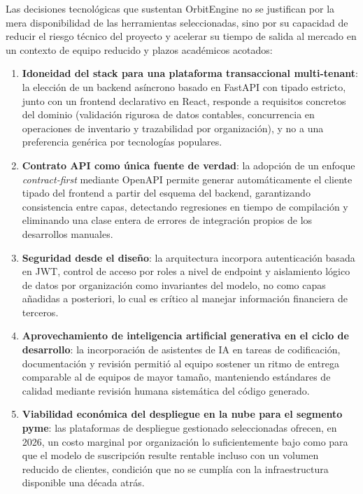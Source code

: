 Las decisiones tecnológicas que sustentan OrbitEngine no se justifican por la mera disponibilidad de las herramientas seleccionadas, sino por su capacidad de reducir el riesgo técnico del proyecto y acelerar su tiempo de salida al mercado en un contexto de equipo reducido y plazos académicos acotados:

\begin{enumerate}
\def\labelenumi{\arabic{enumi}.}
\tightlist
\item
  \textbf{Idoneidad del stack para una plataforma transaccional multi-tenant}: la elección de un backend asíncrono basado en FastAPI con tipado estricto, junto con un frontend declarativo en React, responde a requisitos concretos del dominio (validación rigurosa de datos contables, concurrencia en operaciones de inventario y trazabilidad por organización), y no a una preferencia genérica por tecnologías populares.
\item
  \textbf{Contrato API como única fuente de verdad}: la adopción de un enfoque \emph{contract-first} mediante OpenAPI permite generar automáticamente el cliente tipado del frontend a partir del esquema del backend, garantizando consistencia entre capas, detectando regresiones en tiempo de compilación y eliminando una clase entera de errores de integración propios de los desarrollos manuales.
\item
  \textbf{Seguridad desde el diseño}: la arquitectura incorpora autenticación basada en JWT, control de acceso por roles a nivel de endpoint y aislamiento lógico de datos por organización como invariantes del modelo, no como capas añadidas a posteriori, lo cual es crítico al manejar información financiera de terceros.
\item
  \textbf{Aprovechamiento de inteligencia artificial generativa en el ciclo de desarrollo}: la incorporación de asistentes de IA en tareas de codificación, documentación y revisión permitió al equipo sostener un ritmo de entrega comparable al de equipos de mayor tamaño, manteniendo estándares de calidad mediante revisión humana sistemática del código generado.
\item
  \textbf{Viabilidad económica del despliegue en la nube para el segmento pyme}: las plataformas de despliegue gestionado seleccionadas ofrecen, en 2026, un costo marginal por organización lo suficientemente bajo como para que el modelo de suscripción resulte rentable incluso con un volumen reducido de clientes, condición que no se cumplía con la infraestructura disponible una década atrás.
\end{enumerate}

